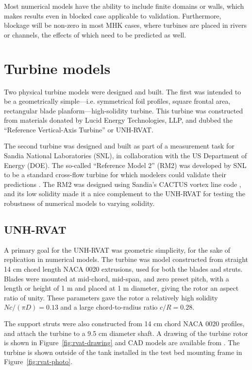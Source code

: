 Most numerical models have the ability to include finite domains or walls, which
makes results even in blocked case applicable to validation. Furthermore,
blockage will be non-zero in most MHK cases, where turbines are placed in rivers
or channels, the effects of which need to be predicted as well.


\section{Turbine models}

Two physical turbine models were designed and built. The first was intended to
be a geometrically simple---i.e. symmetrical foil profiles, square frontal area,
rectangular blade planform---high-solidity turbine. This turbine was constructed
from materials donated by Lucid Energy Technologies, LLP, and dubbed the
``Reference Vertical-Axis Turbine'' or UNH-RVAT.

The second turbine was designed and built as part of a measurement task for
Sandia National Laboratories (SNL), in collaboration with the US Department of
Energy (DOE). The so-called ``Reference Model 2'' (RM2) was developed by SNL to
be a standard cross-flow turbine for which modelers could validate their
predictions \cite{Neary2014}. The RM2 was designed using Sandia's CACTUS vortex
line code \cite{Barone2011}, and its low solidity made it a nice complement to
the UNH-RVAT for testing the robustness of numerical models to varying solidity.


\subsection{UNH-RVAT}

A primary goal for the UNH-RVAT was geometric simplicity, for the sake of
replication in numerical models. The turbine was model constructed from straight
14 cm chord length NACA 0020 extrusions, used for both the blades and struts.
Blades were mounted at mid-chord, mid-span, and zero preset pitch, with a length
or height of 1 m and placed at 1 m diameter, giving the rotor an aspect ratio of
unity. These parameters gave the rotor a relatively high solidity $Nc/(\pi D) =
0.13$ and a large chord-to-radius ratio $c/R = 0.28$. 

The support struts were also constructed from 14 cm chord NACA 0020 profiles,
and attach the turbine to a 9.5 cm diameter shaft. A drawing of the turbine
rotor is shown in Figure~\ref{fig:rvat-drawing} and CAD models are available
from \cite{Bachant2014-RVAT-CAD}. The turbine is shown outside of the tank
installed in the test bed mounting frame in Figure~\ref{fig:rvat-photo}.

